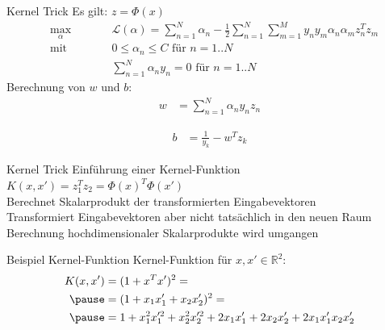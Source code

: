 \documentclass[ngerman]{beamer}
\newcommand{\Lagr}{\mathcal{L}}
\begin{document}
\begin{frame}{Kernel Trick} %
    Es gilt: $z = \Phi(x)$ \\
    \begin{subequations}
        \begin{alignat*}{2}
            &\!\max_{\alpha}        &\qquad&  	\Lagr(\alpha) = \sum_{n=1}^{N} \alpha_{n} - \frac{1}{2} \sum_{n=1}^{N} \sum_{m=1}^{M} y_{n} y_{m} \alpha_{n} \alpha_{m} z_{n}^{T} z_{m}\\
            &\text{mit } &      & 0 \leq \alpha_{n} \leq C \text{ für } n=1..N\\
            &       & & \sum_{n=1}^{N} \alpha_{n} y_{n} = 0\text{ für } n=1..N
        \end{alignat*}
    \end{subequations}
    \pause
    Berechnung von $w$ und $b$:
    \begin{equation*}
        \begin{aligned}
            w &= \sum_{n=1}^{N} \alpha_{n} y_{n} z_{n}
        \end{aligned}
    \end{equation*}

    \begin{equation*}
        \begin{aligned}
            b &= \frac{1}{y_{k}} - w^{T} z_{k}
        \end{aligned}
    \end{equation*}
\end{frame}

\begin{frame}{Kernel Trick}
    Einführung einer Kernel-Funktion $K(x, x') = z_{1}^{T} z_{2} = \Phi(x)^{T} \Phi(x')$ \\ \pause
    Berechnet Skalarprodukt der transformierten Eingabevektoren \\
    Transformiert Eingabevektoren aber nicht tatsächlich in den neuen Raum \\ \pause
    Berechnung hochdimensionaler Skalarprodukte wird umgangen
\end{frame}

\begin{frame}{Beispiel Kernel-Funktion}
    Kernel-Funktion für $x, x' \in \mathbb{R}^2$: \\
    \begin{equation*} \label{eq:example1_kernel_pres}
    \begin{aligned}
        K(x, x') &= (1 + x^{T}x')^{2} = \\ \pause
        &= (1 + x_{1} x_{1}' + x_{2} x_{2}')^{2} = \\ \pause
        &= 1 + x_{1}^2 x_{1}'^2 + x_{2}^{2} x_{2}'^{2} + 2x_{1} x_{1}' + 2 x_{2} x_{2}' + 2 x_{1} x_{1}'x_{2} x_{2}'
    \end{aligned}
    \end{equation*}
\end{frame}
\end{document}
